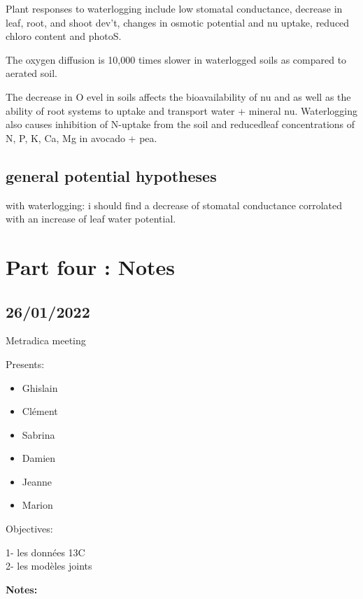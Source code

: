 \documentclass[
]{book}
\providecommand{\tightlist}{%
  \setlength{\itemsep}{0pt}\setlength{\parskip}{0pt}}
\begin{document}
Plant responses to waterlogging include low stomatal conductance, decrease in leaf, root, and shoot dev't, changes in osmotic potential and nu uptake, reduced chloro content and photoS.

The oxygen diffusion is 10,000 times slower in waterlogged soils as compared to aerated soil.

The decrease in O evel in soils affects the bioavailability of nu and as well as the ability of root systems to uptake and transport water + mineral nu. Waterlogging also causes inhibition of N-uptake from the soil and reducedleaf concentrations of N, P, K, Ca, Mg in avocado + pea.

\hypertarget{general-potential-hypotheses}{%
\chapter{general potential hypotheses}\label{general-potential-hypotheses}}

with waterlogging: i should find a decrease of stomatal conductance corrolated with an increase of leaf water potential.

\hypertarget{part-part-four-notes}{%
\part{Part four : Notes}\label{part-part-four-notes}}

\hypertarget{section}{%
\chapter{26/01/2022}\label{section}}

Metradica meeting

Presents:

\begin{itemize}
\tightlist
\item
  Ghislain
\item
  Clément\\
\item
  Sabrina
\item
  Damien\\
\item
  Jeanne
\item
  Marion
\end{itemize}

Objectives:

1- les données 13C\\
2- les modèles joints

\textbf{Notes:}
\end{document}
